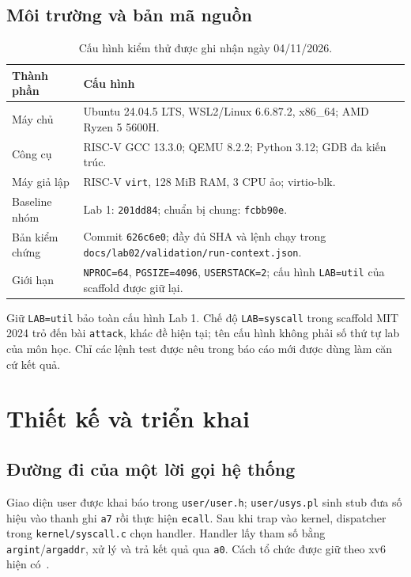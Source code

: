 \documentclass[12pt,a4paper]{article}
\newcommand{\code}[1]{\texttt{#1}}
\begin{document}
\subsection{Môi trường và bản mã nguồn}
\begin{table}[H]
\centering\small
\caption{Cấu hình kiểm thử được ghi nhận ngày 04/11/2026.}
\label{tab:environment}
\begin{tabularx}{\textwidth}{@{}P{3.2cm}Y@{}}
\toprule
{}\textbf{Thành phần} & \textbf{Cấu hình}\\
\midrule
Máy chủ & Ubuntu 24.04.5 LTS, WSL2/Linux 6.6.87.2, x86\_64; AMD Ryzen 5 5600H.\\
Công cụ & RISC-V GCC 13.3.0; QEMU 8.2.2; Python 3.12; GDB đa kiến trúc.\\
Máy giả lập & RISC-V \code{virt}, 128 MiB RAM, 3 CPU ảo; virtio-blk.\\
Baseline nhóm & Lab 1: \code{201dd84}; chuẩn bị chung: \code{fcbb90e}.\\
Bản kiểm chứng & Commit \code{626c6e0}; đầy đủ SHA và lệnh chạy trong \code{docs/lab02/validation/run-context.json}.\\
Giới hạn & \code{NPROC=64}, \code{PGSIZE=4096}, \code{USERSTACK=2}; cấu hình \code{LAB=util} của scaffold được giữ lại.\\
\bottomrule
\end{tabularx}
\end{table}
Giữ \code{LAB=util} bảo toàn cấu hình Lab 1. Chế độ \code{LAB=syscall} trong scaffold MIT 2024 trỏ đến bài \code{attack}, khác đề hiện tại; tên cấu hình không phải số thứ tự lab của môn học. Chỉ các lệnh test được nêu trong báo cáo mới được dùng làm căn cứ kết quả.

\clearpage
\section{Thiết kế và triển khai}\label{sec:design}
\subsection{Đường đi của một lời gọi hệ thống}
Giao diện user được khai báo trong \code{user/user.h}; \code{user/usys.pl} sinh stub đưa số hiệu vào thanh ghi \code{a7} rồi thực hiện \code{ecall}. Sau khi trap vào kernel, dispatcher trong \code{kernel/syscall.c} chọn handler. Handler lấy tham số bằng \code{argint}/\code{argaddr}, xử lý và trả kết quả qua \code{a0}. Cách tổ chức được giữ theo xv6 hiện có~\cite{xv6-book,source}.
\end{document}
